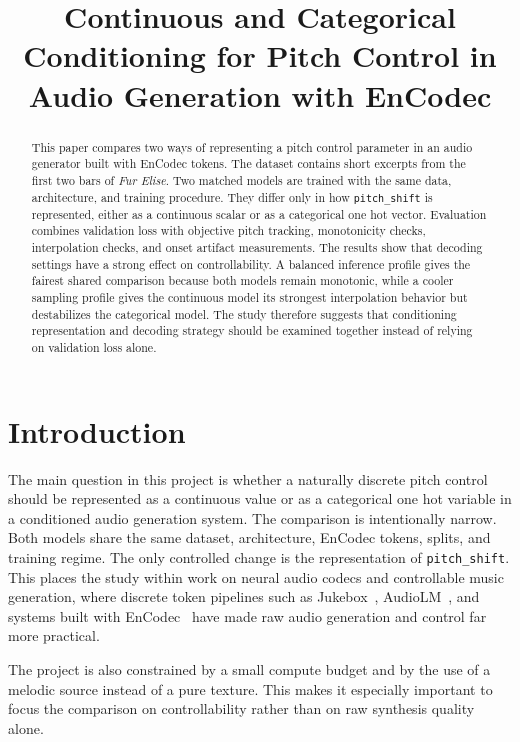 \documentclass{article}
\title{Continuous and Categorical Conditioning for Pitch Control in Audio Generation with EnCodec}
\begin{document}
\maketitle

\begin{abstract}
This paper compares two ways of representing a pitch control parameter in an audio generator built with EnCodec tokens. The dataset contains short excerpts from the first two bars of \textit{Fur Elise}. Two matched models are trained with the same data, architecture, and training procedure. They differ only in how \texttt{pitch\_shift} is represented, either as a continuous scalar or as a categorical one hot vector. Evaluation combines validation loss with objective pitch tracking, monotonicity checks, interpolation checks, and onset artifact measurements. The results show that decoding settings have a strong effect on controllability. A balanced inference profile gives the fairest shared comparison because both models remain monotonic, while a cooler sampling profile gives the continuous model its strongest interpolation behavior but destabilizes the categorical model. The study therefore suggests that conditioning representation and decoding strategy should be examined together instead of relying on validation loss alone.
\end{abstract}

\section{Introduction}\label{sec:introduction}

The main question in this project is whether a naturally discrete pitch control should be represented as a continuous value or as a categorical one hot variable in a conditioned audio generation system. The comparison is intentionally narrow. Both models share the same dataset, architecture, EnCodec tokens, splits, and training regime. The only controlled change is the representation of \texttt{pitch\_shift}. This places the study within work on neural audio codecs and controllable music generation, where discrete token pipelines such as Jukebox~\cite{dhariwal2020jukebox}, AudioLM~\cite{borsos2023audiolm}, and systems built with EnCodec~\cite{defossez2022high,copet2023simple} have made raw audio generation and control far more practical.

The project is also constrained by a small compute budget and by the use of a melodic source instead of a pure texture. This makes it especially important to focus the comparison on controllability rather than on raw synthesis quality alone.
\end{document}
